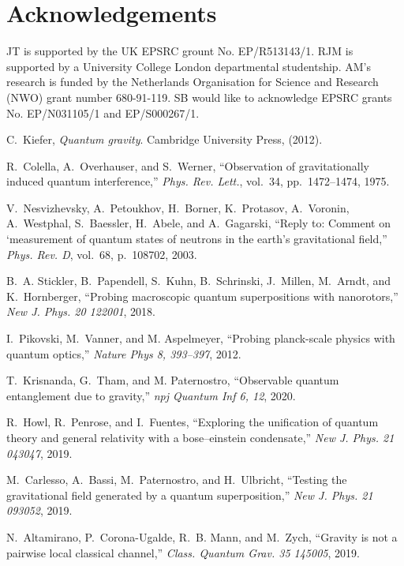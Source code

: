 \documentclass[%
 12pt,
 superscriptaddress,
 amsmath,
 amssymb,
 onecolumn,
 longbibliography
]{revtex4-2}
\begin{document}
\section{Acknowledgements}
JT is supported by the UK EPSRC grount No. EP/R513143/1. RJM is supported by a University College London departmental studentship. AM’s research is funded by the Netherlands Organisation for Science and Research (NWO) grant number 680-91-119. SB would like to acknowledge EPSRC grants No. EP/N031105/1 and EP/S000267/1.


\begin{thebibliography}{10}

C.~Kiefer, {\em Quantum gravity}.
\newblock Cambridge University Press, (2012).

R.~Colella, A.~Overhauser, and S.~Werner, ``{Observation of gravitationally
  induced quantum interference},'' {\em Phys. Rev. Lett.}, vol.~34,
  pp.~1472--1474, 1975.

V.~Nesvizhevsky, A.~Petoukhov, H.~Borner, K.~Protasov, A.~Voronin, A.~Westphal,
  S.~Baessler, H.~Abele, and A.~Gagarski, ``{Reply to: Comment on `measurement
  of quantum states of neutrons in the earth's gravitational field},'' {\em
  Phys. Rev. D}, vol.~68, p.~108702, 2003.

B.~A. Stickler, B.~Papendell, S.~Kuhn, B.~Schrinski, J.~Millen, M.~Arndt, and
  K.~Hornberger, ``Probing macroscopic quantum superpositions with
  nanorotors,'' {\em New J. Phys. 20 122001}, 2018.

I.~Pikovski, M.~Vanner, and M. Aspelmeyer, ``Probing planck-scale physics
  with quantum optics,'' {\em Nature Phys 8, 393–397}, 2012.

T.~Krisnanda, G.~Tham, and M. Paternostro, ``Observable quantum
  entanglement due to gravity,'' {\em npj Quantum Inf 6, 12}, 2020.

R.~Howl, R.~Penrose, and I.~Fuentes, ``Exploring the unification of quantum
  theory and general relativity with a bose–einstein condensate,'' {\em New
  J. Phys. 21 043047}, 2019.

M.~Carlesso, A.~Bassi, M.~Paternostro, and H.~Ulbricht, ``Testing the
  gravitational field generated by a quantum superposition,'' {\em New J. Phys.
  21 093052}, 2019.

N.~Altamirano, P.~Corona-Ugalde, R.~B. Mann, and M.~Zych, ``Gravity is not a
  pairwise local classical channel,'' {\em Class. Quantum Grav. 35 145005},
  2019.


\end{thebibliography}
\end{document}

